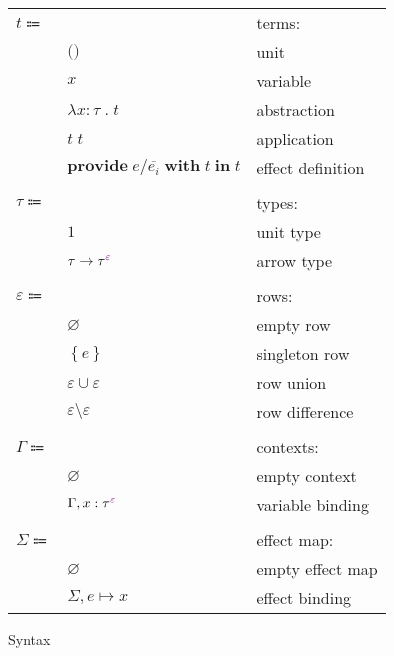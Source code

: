 \documentclass[12pt]{article}
\newcommand\anno[2]{#1 : #2}
\newcommand\term{t}
\newcommand\eUnit{\texttt{()}}
\newcommand\eVar{x}
\newcommand\eAbs[2]{\lambda #1 \; . \; #2}
\newcommand\eApp[2]{#1 \; #2}
\newcommand\eProvide[4]{\textbf{provide} \; #1 / #2 \; \textbf{with} \; #3 \; \textbf{in} \; #4}
\newcommand\type{\tau}
\newcommand\tUnit{1}
\newcommand\tArrow[2]{#1 \rightarrow #2}
\newcommand\tEmbellished[2]{{#1}^{\textcolor{violet}{#2}}}
\newcommand\row{\varepsilon}
\newcommand\rEmpty{\varnothing}
\newcommand\rSingleton[1]{\left\{ #1 \right\}}
\newcommand\rUnion[2]{#1 \cup #2}
\newcommand\rDiff[2]{#1 \setminus #2}
\newcommand\context{\Gamma}
\newcommand\cEmpty{\varnothing}
\newcommand\cExtend[2]{#1, #2}
\newcommand\effect{e}
\newcommand\effectMap{\Sigma}
\newcommand\emMap[2]{#1 \mapsto #2}
\newcommand\emEmpty{\varnothing}
\newcommand\emExtend[2]{#1, #2}
\begin{document}
      \begin{figure}[H]
        \begin{mdframed}[backgroundcolor=none]
          \begin{center}
            \begin{tabular}{l l l}
              $\term \Coloneqq $ & & terms: \\
              & $\eUnit$ & unit \\
              & $\eVar$ & variable \\
              & $\eAbs{\anno{\eVar}{\type}}{\term}$ & abstraction \\
              & $\eApp{\term}{\term}$ & application \\
              & $\eProvide{\effect}{\overline{\effect_i}}{\term}{\term}$ & effect definition \\
              \\
              $\type \Coloneqq$ & & types: \\
              & $\tUnit$ & unit type \\
              & $\tArrow{\type}{\tEmbellished{\type}{\row}}$ & arrow type \\
              \\
              $\row \Coloneqq$ & & rows: \\
              & $\rEmpty$ & empty row \\
              & $\rSingleton{\effect}$ & singleton row \\
              & $\rUnion{\row}{\row}$ & row union \\
              & $\rDiff{\row}{\row}$ & row difference \\
              \\
              $\context \Coloneqq$ & & contexts: \\
              & $\cEmpty$ & empty context \\
              & $\cExtend{\context}{\anno{\eVar}{\tEmbellished{\type}{\row}}}$ & variable binding \\
              \\
              $\effectMap \Coloneqq$ & & effect map: \\
              & $\emEmpty$ & empty effect map \\
              & $\emExtend{\effectMap}{\emMap{\effect}{\eVar}}$ & effect binding \\
            \end{tabular}
          \end{center}

          \caption{Syntax}\label{fig:syntax}
        \end{mdframed}
      \end{figure}
\end{document}
